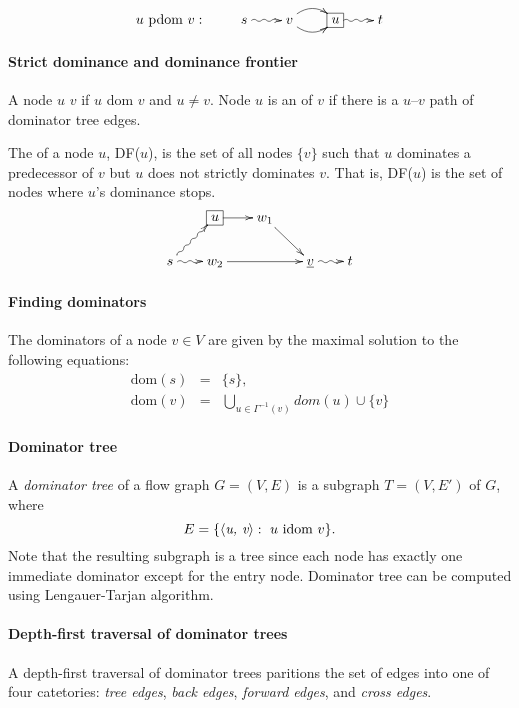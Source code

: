 \documentclass{memo}
\begin{document}
\[\xymatrix@-0.2pc{
  \mbox{$u$ pdom $v$}: & s \ar@{~>}[r] & v \ar@/^2ex/[r] \ar@/_2ex/[r] & *+[F]{u} \ar@{~>}[r] & t
}
\]

\paragraph{Strict dominance and dominance frontier}
A node $u$  $v$ if $u$ dom $v$ and $u \ne v$.  Node $u$
is an  of $v$ if there is a $u$--$v$ path of dominator tree
edges. 

The  of a node $u$, DF($u$), is the set of all nodes
$\{v\}$ such that $u$ dominates a predecessor of $v$ but $u$ does not
strictly dominates $v$. 
That is, DF($u$) is the set of nodes where $u$'s dominance stops.
\[ \xymatrix@-0.5pc{
                 & *+[F]{u} \ar[r] & w_1 \ar[rd] &   \\
  s \ar@{~>}[ru] \ar@{~>}[r] & w_2 \ar[rr] & & \underline{v} \ar@{~>}[r] & t 
}
\]

\paragraph{Finding dominators}
The dominators of a node $v \in V$ are given by the maximal solution to the
following equations:
\begin{eqnarray*}
  \mbox{dom}(s) & = & \{s\}, \\
  \mbox{dom}(v) & = & \bigcup_{u \in \Gamma^{-1}(v)} dom(u) \cup \{v\}
\end{eqnarray*}


\paragraph{Dominator tree}
A {\em dominator tree\/} of a flow graph $G = (V, E)$ is a subgraph $T = (V,
E')$ of $G$, where 
\[ E = \{\mbox{$\langle{\textit{u, v}}\rangle$}: \mbox{ $u$ idom $v$} \}. \]
Note that the resulting subgraph is a tree since each node has exactly one
immediate dominator except for the entry node.
Dominator tree can be computed using Lengauer-Tarjan algorithm.

\paragraph{Depth-first traversal of dominator trees}
A depth-first traversal of dominator trees paritions the set of edges into one
of four catetories: {\em tree edges\/}, {\em back edges\/}, {\em forward
  edges\/}, and {\em cross edges\/}.
\end{document}
